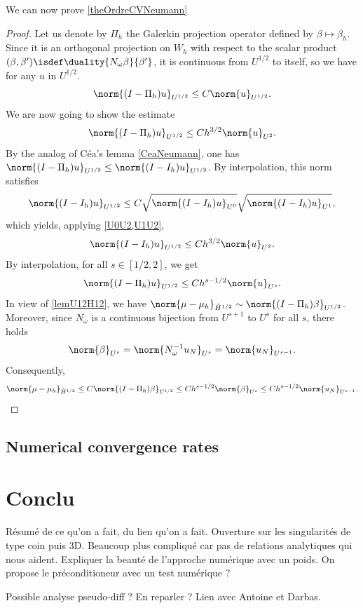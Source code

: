 \documentclass[a4paper]{article}
\begin{document}
	\noindent We can now prove \autoref{theOrdreCVNeumann}
	\begin{proof}
		Let us denote by $\Pi_h$ the Galerkin projection operator defined by $\beta \mapsto \beta_h$. Since it is an orthogonal projection on $W_h$ with respect to the scalar product $(\beta,\beta') \isdef \duality{N_\omega \beta}{\beta'}$, it is continuous from $U^{1/2}$ to itself, so we have for any $u$ in $U^{1/2}$. 
		\[\norm{(I - \Pi_h)u}_{U^{1/2}} \leq C \norm{u}_{U^{1/2}}.\]
		We are now going to show the estimate
		\[\norm{(I - \Pi_h)u}_{U^{1/2}} \leq C h^{3/2} \norm{u}_{U^{2}}.\]
		By the analog of Céa's lemma \autoref{CeaNeumann}, one has $\norm{(I-\Pi_h)u}_{U^{1/2}} \leq \norm{(I - I_h) u}_{U^{1/2}}$. By interpolation, this norm satisfies
		\[\norm{(I - I_h)u}_{U^{1/2}} \leq C \sqrt{\norm{(I - I_h)u}_{U^{0}}}\sqrt{\norm{(I - I_h)u}_{U^{1}}},\]
		which yields, applying \autoref{U0U2,U1U2},
		\[\norm{(I - I_h)u}_{U^{1/2}} \leq C h^{3/2} \norm{u}_{U^2}.\]
		By interpolation, for all $s \in [1/2,2]$, we get
		\[\norm{(I - \Pi_h)u}_{U^{1/2}} \leq C h^{s - 1/2} \norm{u}_{U^s}.\]
		In view of \autoref{lemU12H12}, we have $\norm{\mu - \mu_h}_{\tilde{H}^{1/2}} \sim \norm{(I - \Pi_h)\beta}_{U^{1/2}}$. Moreover, since $N_\omega$ is a continuous bijection from $U^{s+1}$ to $U^s$ for all $s$, there holds
		\[\norm{\beta}_{U^s} = \norm{N_\omega^{-1} u_N}_{U^s} = \norm{u_N}_{U^{s-1}}.\]
		Consequently, 
		\[\norm{\mu - \mu_h}_{\tilde{H}^{1/2}} \leq  C\norm{(I - \Pi_h)\beta}_{U^{1/2}} \leq C h^{s - 1/2} \norm{\beta}_{U^s} \leq C h^{s - 1/2} \norm{u_N}_{U^{s-1}}.\]
	\end{proof}
	\subsection{Numerical convergence rates}
	
	\section{Conclu}
	
	Résumé de ce qu'on a fait, du lien qu'on a fait. Ouverture sur les singularités de type coin puis 3D. Beaucoup plus compliqué car pas de relations analytiques qui nous aident. 
	Expliquer la beauté de l'approche numérique avec un poids. On propose le préconditioneur avec un test numérique ? 
	
	Possible analyse pseudo-diff ? En reparler ? Lien avec Antoine et Darbas. 
	
	\appendix
\end{document}
